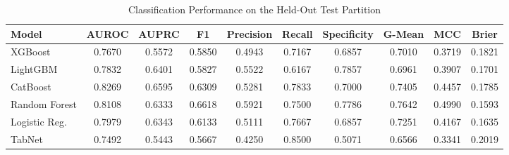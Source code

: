 \begin{table}
\centering
\caption{Classification Performance on the Held-Out Test Partition}
\label{tab:results}
\begin{tabular}{lccccccccc}
\toprule
Model & AUROC & AUPRC & F1 & Precision & Recall & Specificity & G-Mean & MCC & Brier \\
\midrule
XGBoost & 0.7670 & 0.5572 & 0.5850 & 0.4943 & 0.7167 & 0.6857 & 0.7010 & 0.3719 & 0.1821 \\
LightGBM & 0.7832 & 0.6401 & 0.5827 & 0.5522 & 0.6167 & 0.7857 & 0.6961 & 0.3907 & 0.1701 \\
CatBoost & 0.8269 & 0.6595 & 0.6309 & 0.5281 & 0.7833 & 0.7000 & 0.7405 & 0.4457 & 0.1785 \\
Random Forest & 0.8108 & 0.6333 & 0.6618 & 0.5921 & 0.7500 & 0.7786 & 0.7642 & 0.4990 & 0.1593 \\
Logistic Reg. & 0.7979 & 0.6343 & 0.6133 & 0.5111 & 0.7667 & 0.6857 & 0.7251 & 0.4167 & 0.1635 \\
TabNet & 0.7492 & 0.5443 & 0.5667 & 0.4250 & 0.8500 & 0.5071 & 0.6566 & 0.3341 & 0.2019 \\
\bottomrule
\end{tabular}
\end{table}
